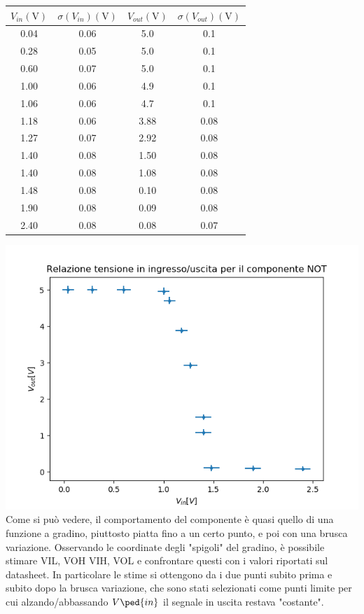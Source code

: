 \documentclass[10pt,a4paper]{article}
\begin{document}
	\begin{center}
\begin{tabular}{|c|c|c|c|}
	\hline 
	$V_{in}(\si{\volt})$ & $\sigma(V_{in}) (\si{\volt})$ & $V_{out} (\si{\volt})$ & $\sigma(V_{out}) (\si{\volt})$ \\ 
	\hline 
	0.04&0.06&5.0&0.1\\ \hline
	0.28&0.05&5.0&0.1\\ \hline
	0.60&0.07&5.0&0.1\\ \hline
	1.00&0.06&4.9&0.1\\ \hline
	1.06&0.06&4.7&0.1\\ \hline
	1.18&0.06&3.88&0.08\\ \hline
	1.27&0.07&2.92&0.08\\ \hline
	1.40&0.08&1.50&0.08\\ \hline
	1.40&0.08&1.08&0.08\\ \hline
	1.48&0.08&0.10&0.08\\ \hline
	1.90&0.08&0.09&0.08\\ \hline
	2.40&0.08&0.08&0.07\\ \hline
\end{tabular} 
	\end{center}
\includegraphics[scale=0.5]{gain.png}\centering
\\Come si può vedere, il comportamento del componente è quasi quello di una funzione a gradino, piuttosto piatta fino a un certo punto, e poi con una brusca variazione.
Osservando le coordinate degli "spigoli" del gradino, è possibile  stimare VIL, VOH  VIH, VOL e confrontare questi  con i valori riportati sul datasheet. In particolare le stime si  ottengono da i due punti subito prima e subito dopo la brusca variazione, che sono stati selezionati come punti limite per cui alzando/abbassando $V\ped{in}$ il segnale in uscita restava "costante".
\\
\end{document}
